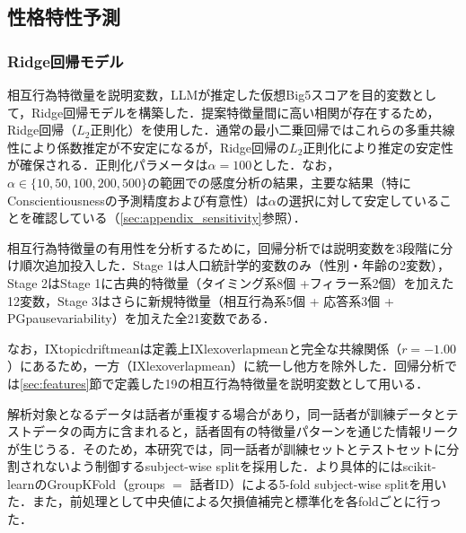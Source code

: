 \documentclass[dvipdfmx,11pt,a4paper]{bxjsarticle}
\renewcommand{\_}{\paperorigunderscore\allowbreak}%
\begin{document}
\subsection{性格特性予測}
\label{sec:pred_personality}

\subsubsection{Ridge回帰モデル}

相互行為特徴量を説明変数，LLMが推定した仮想Big5スコアを目的変数として，Ridge回帰モデルを構築した．提案特徴量間に高い相関が存在するため，Ridge回帰（$L_2$正則化）を使用した．通常の最小二乗回帰ではこれらの多重共線性により係数推定が不安定になるが，Ridge回帰の$L_2$正則化により推定の安定性が確保される．正則化パラメータは$\alpha = 100$とした．なお，$\alpha \in \{10, 50, 100, 200, 500\}$の範囲での感度分析の結果，主要な結果（特にConscientiousnessの予測精度および有意性）は$\alpha$の選択に対して安定していることを確認している（\ref{sec:appendix_sensitivity}参照）．

相互行為特徴量の有用性を分析するために，回帰分析では説明変数を3段階に分け順次追加投入した．Stage 1は人口統計学的変数のみ（性別・年齢の2変数），Stage 2はStage 1に古典的特徴量（タイミング系8個 +フィラー系2個）を加えた12変数，Stage 3はさらに新規特徴量（相互行為系5個 + 応答系3個 + PG\_pause\_variability）を加えた全21変数である．

なお，IX\_topic\_drift\_meanは定義上IX\_lex\_overlap\_meanと完全な共線関係（$r = -1.00$）にあるため，一方（IX\_lex\_overlap\_mean）に統一し他方を除外した．回帰分析では\ref{sec:features}節で定義した19の相互行為特徴量を説明変数として用いる．

解析対象となるデータは話者が重複する場合があり，同一話者が訓練データとテストデータの両方に含まれると，話者固有の特徴量パターンを通じた情報リークが生じうる．そのため，本研究では，同一話者が訓練セットとテストセットに分割されないよう制御するsubject-wise splitを採用した．より具体的にはscikit-learnのGroupKFold（groups $=$ 話者ID）による5-fold subject-wise splitを用いた．また，前処理として中央値による欠損値補完と標準化を各foldごとに行った．


\end{document}
